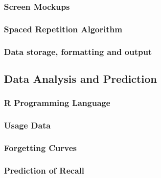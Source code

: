 \subsubsection{Screen Mockups}
\subsubsection{Spaced Repetition Algorithm}
\subsubsection{Data storage, formatting and output}

\subsection{Data Analysis and Prediction}
\subsubsection{R Programming Language}
\subsubsection{Usage Data}
\subsubsection{Forgetting Curves}
\subsubsection{Prediction of Recall}
